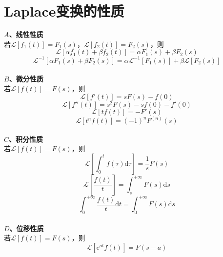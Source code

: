 \documentclass[12pt, a4paper, twoside]{ctexbook}
\begin{document}
\section{Laplace变换的性质}
\textbf{$A$、线性性质}\\
若$\mathscr{L}\left[f_1\left(t\right)\right]=F_1\left(s\right)$，$\mathscr{L}\left[f_2\left(t\right)\right]=F_2\left(s\right)$，则
$$
\mathscr{L}\left[ \alpha f_1\left( t \right) +\beta f_2\left( t \right) \right] =\alpha F_1\left( s \right) +\beta F_2\left( s \right) 
$$
$$
\mathscr{L}^{-1}\left[ \alpha F_1\left( s \right) +\beta F_2\left( s \right) \right] = \alpha \mathscr{L}^{-1}\left[F_1\left(s\right)\right]+\beta\mathscr{L}\left[F_2\left(s\right)\right]
$$
~\\

\textbf{$B$、微分性质}\\
若$\mathscr{L}\left[f\left(t\right)\right]=F\left(s\right)$，则
$$
\mathscr{L}\left[f'\left(t\right)\right]=sF\left(s\right)-f\left(0\right)
$$
$$
\mathscr{L}\left[f''\left(t\right)\right]=s^2F\left(s\right)-sf\left(0\right)-f'\left(0\right)
$$
$$
\mathscr{L}\left[tf\left(t\right)\right]=-F'\left(s\right)
$$
$$
\mathscr{L}\left[t^n f\left(t\right)\right]=\left(-1\right)^n F^{\left(n\right)}\left(s\right)
$$
~\\

\textbf{$C$、积分性质}\\
若$\mathscr{L}\left[f\left(t\right)\right]=F\left(s\right)$，则
$$
\mathscr{L}\left[ \int_{0}^t{f\left( \tau \right) \text{d}\tau} \right] =\frac{1}{s}F\left( s \right)
$$
$$
\mathscr{L}\left[\frac{f\left(t\right)}{t}\right]=\int_{s}^{+\infty}{F\left(s\right)\mathrm{d}s}
$$
$$
\int_{0}^{+\infty}{\frac{f\left(t\right)}{t}\mathrm{d}t}=\int_{0}^{+\infty}{F\left(s\right)\mathrm{d}s}
$$
~\\

\textbf{$D$、位移性质}\\
若$\mathscr{L}\left[f\left(t\right)\right]=F\left(s\right)$，则
$$
\mathscr{L}\left[\mathrm{e}^{at}f\left(t\right)\right]=F\left(s-a\right)
$$
~\\
\end{document}
